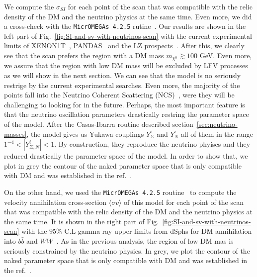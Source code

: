 \documentclass[12pt,letterpaper]{article}
\begin{document}
We compute the $\sigma_{SI}$ for each point of the scan that was compatible with the relic density of the DM and the neutrino physics at the same time. Even more, we did a cross-check with the \texttt{MicrOMEGAs 4.2.5} rutine~\cite{Belanger:2006is}. 
Our results are shown in the left part of Fig.~\ref{fig:SI-and-sv-with-neutrinos-scan} with the current experimental limits of XENON1T~\cite{Aprile:2018dbl}, PANDAS~\cite{Cui:2017nnn} and the LZ prospects~\cite{Mount:2017qzi}. 
After this, we clearly see that the scan prefers the region with a DM mass $m_{\chi^0}\gtrsim 100$ GeV. 
Even more, we assure that the region with low DM mass will be excluded by LFV processes as we will show in the next section.
We can see that the model is no seriously restrige by the current experimental searches. Even more, the majority of the points fall into the Neutrino Coherent Scattering (NCS)~\cite{Cushman:2013zza, Billard:2013qya}, were they will be challenging to looking for in the future.
Perhaps, the most important feature is that the neutrino oscillation parameters drastically restring the parameter space of the model. 
After the Casas-Ibarra routine described section~\ref{sec:neutrino-masses}, the model gives us Yukawa couplings $Y_{\Sigma}^i$ and $Y_N^i$ all of them in the range $1^{-4}<|Y_{\Sigma, N}^i|<1$. By construction, they reproduce the neutrino phyiscs and they reduced drastically the parameter space of the model. In order to show that, we plot in grey the contour of the naked parameter space that is only compatible with DM and was established in the ref.~\cite{Hirsch:2013ola}.   

On the other hand, we used the \texttt{MicrOMEGAs 4.2.5} routine~\cite{Belanger:2006is} to compute the velocity annihilation cross-section $\langle \sigma v\rangle$ of this model for each point of the scan that was compatible with the relic density of the DM and the neutrino physics at the same time. 
It is shown in the right part of Fig.~\ref{fig:SI-and-sv-with-neutrinos-scan} with the $95\%$ C.L gamma-ray upper limits from dSphs for DM annihilation into $b\bar{b}$ and $WW$~\cite{Ackermann:2015zua}.
As in the previous analysis, the region of low DM mas is seriously constrained by the neutrino physics. In grey, we plot the contour of the naked parameter space that is only compatible with DM and was established in the ref.~\cite{Hirsch:2013ola}.
\end{document}
